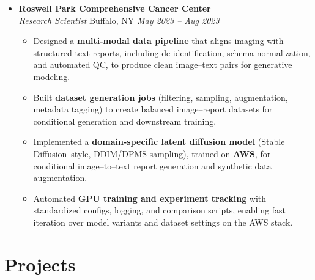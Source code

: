 \documentclass[letterpaper,10pt]{article}
\begin{document}
\begin{itemize}[leftmargin=0in, label={}]
\begin{itemize}[leftmargin=0.2in, topsep=1pt]
\end{itemize}




\vspace*{-1pt}
\item \textbf{Roswell Park Comprehensive Cancer Center}\\
\textit{Research Scientist} \hfill Buffalo, NY \quad \textit{May 2023 -- Aug 2023}
\vspace*{-3pt}
\begin{itemize}[leftmargin=0.2in, topsep=1pt]
   \item Designed a \textbf{multi-modal data pipeline} that aligns imaging with structured text reports, including de-identification, schema normalization, and automated QC, to produce clean image–text pairs for generative modeling.
  \item Built \textbf{dataset generation jobs} (filtering, sampling, augmentation, metadata tagging) to create balanced image–report datasets for conditional generation and downstream training.
  \item Implemented a \textbf{domain-specific latent diffusion model} (Stable Diffusion–style, DDIM/DPMS sampling), trained on \textbf{AWS}, for conditional image–to–text report generation and synthetic data augmentation.
  \item Automated \textbf{GPU training and experiment tracking} with standardized configs, logging, and comparison scripts, enabling fast iteration over model variants and dataset settings on the AWS stack. 
\end{itemize}





\end{itemize}
\vspace*{-10pt}
\vspace*{-2pt}
\section{Projects}
\end{document}
